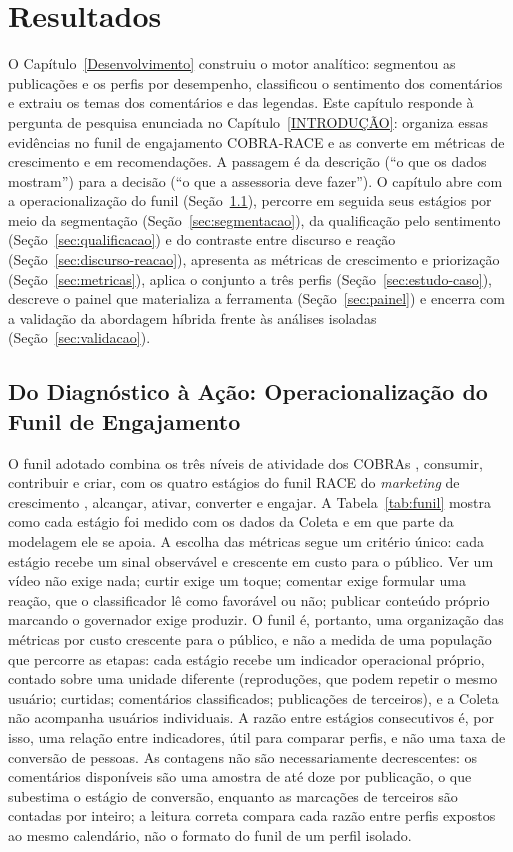 \chapter{Resultados}\label{Resultados}

O Capítulo~\ref{Desenvolvimento} construiu o motor analítico: segmentou as publicações e os perfis por desempenho, classificou o sentimento dos comentários e extraiu os temas dos comentários e das legendas. Este capítulo responde à pergunta de pesquisa enunciada no Capítulo~\ref{INTRODUÇÃO}: organiza essas evidências no funil de engajamento COBRA-RACE e as converte em métricas de crescimento e em recomendações. A passagem é da descrição (``o que os dados mostram'') para a decisão (``o que a assessoria deve fazer''). O capítulo abre com a operacionalização do funil (Seção~\ref{sec:funil}), percorre em seguida seus estágios por meio da segmentação (Seção~\ref{sec:segmentacao}), da qualificação pelo sentimento (Seção~\ref{sec:qualificacao}) e do contraste entre discurso e reação (Seção~\ref{sec:discurso-reacao}), apresenta as métricas de crescimento e priorização (Seção~\ref{sec:metricas}), aplica o conjunto a três perfis (Seção~\ref{sec:estudo-caso}), descreve o painel que materializa a ferramenta (Seção~\ref{sec:painel}) e encerra com a validação da abordagem híbrida frente às análises isoladas (Seção~\ref{sec:validacao}).

\section{Do Diagnóstico à Ação: Operacionalização do Funil de Engajamento}\label{sec:funil}

O funil adotado combina os três níveis de atividade dos COBRAs \cite{muntinga2011}, consumir, contribuir e criar, com os quatro estágios do funil RACE do \emph{marketing} de crescimento \cite{feroz2024}, alcançar, ativar, converter e engajar. A Tabela~\ref{tab:funil} mostra como cada estágio foi medido com os dados da Coleta e em que parte da modelagem ele se apoia. A escolha das métricas segue um critério único: cada estágio recebe um sinal observável e crescente em custo para o público. Ver um vídeo não exige nada; curtir exige um toque; comentar exige formular uma reação, que o classificador lê como favorável ou não; publicar conteúdo próprio marcando o governador exige produzir. O funil é, portanto, uma organização das métricas por custo crescente para o público, e não a medida de uma população que percorre as etapas: cada estágio recebe um indicador operacional próprio, contado sobre uma unidade diferente (reproduções, que podem repetir o mesmo usuário; curtidas; comentários classificados; publicações de terceiros), e a Coleta não acompanha usuários individuais. A razão entre estágios consecutivos é, por isso, uma relação entre indicadores, útil para comparar perfis, e não uma taxa de conversão de pessoas. As contagens não são necessariamente decrescentes: os comentários disponíveis são uma amostra de até doze por publicação, o que subestima o estágio de conversão, enquanto as marcações de terceiros são contadas por inteiro; a leitura correta compara cada razão entre perfis expostos ao mesmo calendário, não o formato do funil de um perfil isolado.

